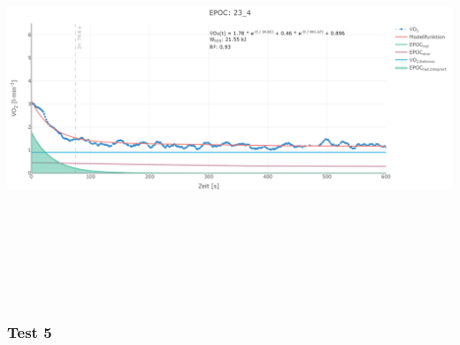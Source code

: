\documentclass[
  letterpaper,
  DIV=11]{scrartcl}
\begin{document}
\includegraphics[width=11.45833in,height=4.6875in]{images/23_4.png}

\subsubsection{Test 5}
\end{document}
